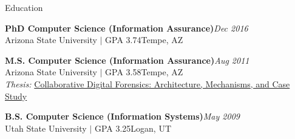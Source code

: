 \documentclass{resume} %
\begin{document}

\begin{rSection}{Education}

\textbf{PhD Computer Science (Information Assurance)}\hfill \emph{Dec 2016}\\
Arizona State University $\mid$ GPA 3.74\hfill {Tempe, AZ}

\textbf{M.S. Computer Science (Information Assurance)}\hfill \emph{Aug 2011}\\
Arizona State University $\mid$ GPA 3.58\hfill {Tempe, AZ}\\
\textit{Thesis:} \href{http://repository.asu.edu/attachments/56996/content/Mabey_asu_0010N_10959.pdf}{Collaborative Digital Forensics: Architecture, Mechanisms, and Case Study}

\textbf{B.S. Computer Science (Information Systems)}\hfill \emph{May 2009}\\
Utah State University $\mid$ GPA 3.25\hfill {Logan, UT}


\end{rSection}


\end{document}
